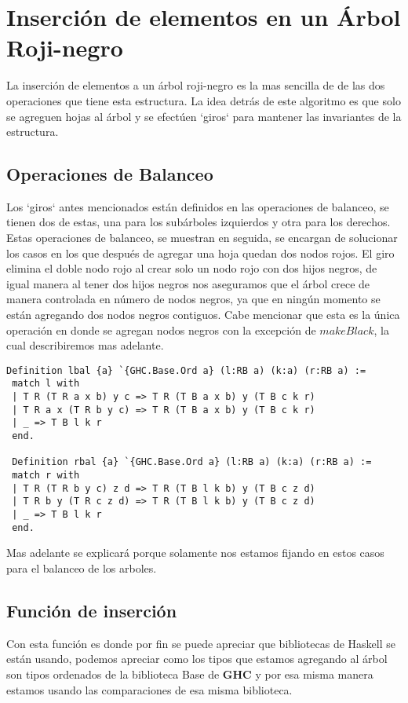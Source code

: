\documentclass[letterpaper,12pt,oneside]{book}
\newcommand{\ARN}{Árbol Roji-negro }
\newcommand{\arn}{árbol roji-negro }
\theoremstyle{plain}
\theoremstyle{definition}
\theoremstyle{remark}
\begin{document}
\section{Inserción de elementos en un \ARN}

La inserci\'on de elementos a un \arn es la mas sencilla de de las dos operaciones que tiene esta estructura. La idea detrás de este algoritmo es que 
solo se agreguen hojas al \'arbol y se efectúen `giros` para mantener las invariantes de la estructura.
\subsection{Operaciones de Balanceo}
Los `giros` antes mencionados están definidos en las operaciones de balanceo, se tienen dos de estas, una para los subárboles izquierdos y otra para los 
derechos. Estas operaciones de balanceo, se muestran en seguida, se encargan de solucionar los casos en los que después de agregar una hoja quedan dos nodos rojos.
El giro elimina el doble nodo rojo al crear solo un nodo rojo con dos hijos negros, de igual manera al tener dos hijos negros nos aseguramos que el árbol crece de manera controlada 
en n\'umero de nodos negros, ya que en ningún momento se están agregando dos nodos negros contiguos. Cabe mencionar que esta es la única operación en donde se agregan nodos negros con la excepción de $makeBlack$, la cual describiremos mas adelante.
\begin{verbatim}
Definition lbal {a} `{GHC.Base.Ord a} (l:RB a) (k:a) (r:RB a) :=
 match l with
 | T R (T R a x b) y c => T R (T B a x b) y (T B c k r)
 | T R a x (T R b y c) => T R (T B a x b) y (T B c k r)
 | _ => T B l k r
 end.

 Definition rbal {a} `{GHC.Base.Ord a} (l:RB a) (k:a) (r:RB a) :=
 match r with
 | T R (T R b y c) z d => T R (T B l k b) y (T B c z d)
 | T R b y (T R c z d) => T R (T B l k b) y (T B c z d)
 | _ => T B l k r
 end.
\end{verbatim}

Mas adelante se explicar\'a porque solamente nos estamos fijando en estos casos para el balanceo de los arboles.
\subsection {Funci\'on de inserci\'on}
Con esta funci\'on es donde por fin se puede apreciar que bibliotecas de Haskell se están usando, podemos apreciar como los tipos que estamos
agregando al \'arbol son tipos ordenados de la biblioteca Base de \textbf{GHC} y por esa misma manera estamos usando las comparaciones de esa misma biblioteca.
\end{document}
